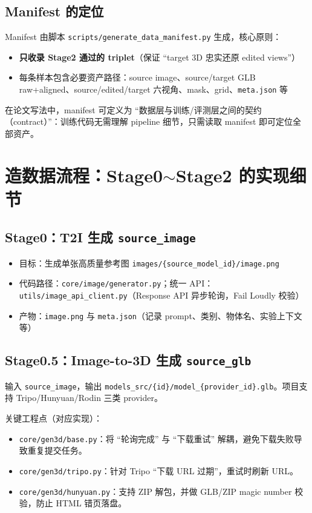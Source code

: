 \documentclass[UTF8,a4paper,11pt]{ctexart}
\begin{document}
\subsection{Manifest 的定位}
Manifest 由脚本 \texttt{scripts/generate\_data\_manifest.py} 生成，核心原则：
\begin{itemize}
  \item \textbf{只收录 Stage2 通过的 triplet}（保证 ``target 3D 忠实还原 edited views''）
  \item 每条样本包含必要资产路径：source image、source/target GLB raw+aligned、source/edited/target 六视角、mask、grid、\texttt{meta.json} 等
\end{itemize}

在论文写法中，manifest 可定义为 ``数据层与训练/评测层之间的契约（contract）''：训练代码无需理解 pipeline 细节，只需读取 manifest 即可定位全部资产。

\section{造数据流程：Stage0\texorpdfstring{$\sim$}{\string~}Stage2 的实现细节}

\subsection{Stage0：T2I 生成 \texttt{source\_image}}
\begin{itemize}
  \item 目标：生成单张高质量参考图 \texttt{images/\{source\_model\_id\}/image.png}
  \item 代码路径：\texttt{core/image/generator.py}；统一 API：\texttt{utils/image\_api\_client.py}（Response API 异步轮询，Fail Loudly 校验）
  \item 产物：\texttt{image.png} 与 \texttt{meta.json}（记录 prompt、类别、物体名、实验上下文等）
\end{itemize}

\subsection{Stage0.5：Image-to-3D 生成 \texttt{source\_glb}}
输入 \texttt{source\_image}，输出 \texttt{models\_src/\{id\}/model\_\{provider\_id\}.glb}。项目支持 Tripo/Hunyuan/Rodin 三类 provider。

关键工程点（对应实现）：
\begin{itemize}
  \item \texttt{core/gen3d/base.py}：将 ``轮询完成'' 与 ``下载重试'' 解耦，避免下载失败导致重复提交任务。
  \item \texttt{core/gen3d/tripo.py}：针对 Tripo ``下载 URL 过期''，重试时刷新 URL。
  \item \texttt{core/gen3d/hunyuan.py}：支持 ZIP 解包，并做 GLB/ZIP magic number 校验，防止 HTML 错页落盘。
\end{itemize}
\end{document}
